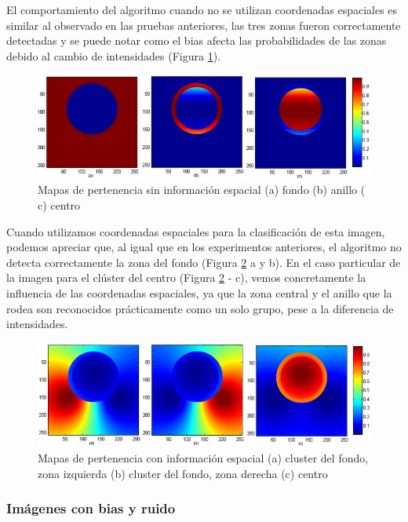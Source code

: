 El comportamiento del algoritmo cuando no se utilizan coordenadas espaciales es similar al observado en las pruebas anteriores, las tres zonas fueron correctamente detectadas y se puede notar como el bias afecta las probabilidades de las zonas debido al cambio de intensidades  (Figura \ref{fig:matriz_circulo_bias}).

\begin{figure}[H]
\centering
\includegraphics[scale=0.3]{images/bias_sin_coord.jpg}
\caption{Mapas de pertenencia sin información espacial (a) fondo (b) anillo ( c) centro}
\label{fig:matriz_circulo_bias}
\end{figure}

Cuando utilizamos coordenadas espaciales para la clasificación de esta imagen, podemos apreciar que, al igual que en los experimentos anteriores, el algoritmo no detecta correctamente la zona del fondo (Figura \ref{fig:matriz_circulo_bias_espacial} a y b). En el caso particular de la imagen para el clúster del centro (Figura \ref{fig:matriz_circulo_bias_espacial} - c), vemos concretamente la influencia de las coordenadas espaciales, ya que la zona central y el anillo que la rodea son reconocidos prácticamente como un solo grupo, pese a la diferencia de intensidades.

\begin{figure}[H]
\centering
\includegraphics[scale=0.3]{images/bias_con_coord.jpg}
\caption{Mapas de pertenencia con información espacial (a) cluster del fondo, zona izquierda (b) cluster del fondo, zona derecha  (c) centro}
\label{fig:matriz_circulo_bias_espacial}
\end{figure}

\subsubsection{Imágenes con bias y ruido}


